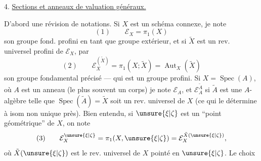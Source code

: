 4. \uline{Sections  et anneaux de valuation généraux.}

D'abord une révision de notations. Si $X$ est un schéma connexe, je note 
\[
(1)\qquad \mathcal E_X=\pi_1(X)
\]
son groupe fond. profini en tant que groupe extérieur, et si $\tilde X$ est un rev. universel profini de $\mathcal E_X$, par
\[
(2)\qquad \mathcal E_X^{(\tilde X)}=\pi_1(X;\tilde X)=\operatorname{Aut}_X(\tilde X)
\]
son groupe fondamental précisé --- qui est un groupe profini. Si $X=\operatorname{Spec}(A)$, où $A$ est un anneau (le plus souvent un corps) je note $\mathcal E_A$, et $\mathcal E_A^{\tilde A}$  si $\tilde A$ est une $A$-algèbre telle que $\operatorname{Spec}(\tilde A)=\tilde X$ soit un rev. universel de $X$ (ce qui le détermine à isom non unique près). Bien entendu, si $\unsure{\xi|\zeta}$ est un ``point géométrique'' de $X$, on note
\[
(3)\qquad \mathcal E_X^{\unsure{\xi|\zeta}}=\pi_1(X,\unsure{\xi|\zeta})=\mathcal E_X^{\tilde X(\unsure{\xi|\zeta})},
\]
où $\tilde X(\unsure{\xi|\zeta})$ est le rev. universel de $X$ pointé en $\unsure{\xi|\zeta}$. Le choix
